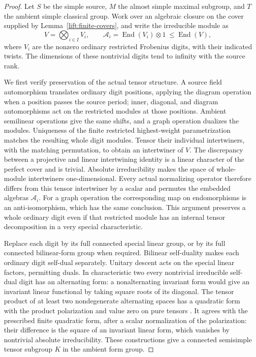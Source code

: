\begin{proof}
Let $S$ be the simple source, $M$ the almost simple maximal subgroup,
and $T$ the ambient simple classical group.  Work over an algebraic
closure on the cover supplied by Lemma~\ref{lift:finite-covers}, and
write the irreducible module as
\[
 V=\bigotimes_{i\in I}V_i,
 \qquad
 \mathcal A_i=\operatorname{End}(V_i)\otimes1
       \ \leq\operatorname{End}(V),
\]
where $V_i$ are the nonzero ordinary restricted Frobenius digits,
with their indicated twists.  The dimensions of these nontrivial
digits tend to infinity with the source rank.

We first verify preservation of the actual tensor structure.  A
source field automorphism translates ordinary digit positions,
applying the diagram operation when a position passes the source
period; inner, diagonal, and diagram automorphisms act on the
restricted modules at those positions.  Ambient semilinear
operations give the same shifts, and a graph operation dualizes
the modules.  Uniqueness of the finite restricted highest-weight
parametrization matches the resulting whole digit modules.  Tensor
their individual intertwiners, with the matching permutation, to
obtain an intertwiner of $V$.  The discrepancy between a projective
and linear intertwining identity is a linear character of the
perfect cover and is trivial.  Absolute irreducibility makes the
space of whole-module intertwiners one-dimensional.  Every actual
normalizing operator therefore differs from this tensor intertwiner
by a scalar and permutes the embedded algebras $\mathcal A_i$.
For a graph operation the corresponding map on endomorphisms is an
anti-isomorphism, which has the same conclusion.  This argument
preserves a whole ordinary digit even if that restricted module
has an internal tensor decomposition in a very special
characteristic.

Replace each digit by its full connected special linear group, or
by its full connected bilinear-form group when required.  Bilinear
self-duality makes each ordinary digit self-dual separately.
Unitary descent acts on the special linear factors, permitting
duals.  In characteristic two every nontrivial irreducible self-dual
digit has an alternating form: a nonalternating invariant form
would give an invariant linear functional by taking square roots
of its diagonal.  The tensor product of at least two nondegenerate
alternating spaces has a quadratic form with the product
polarization and value zero on pure tensors
\cite[Proposition~2.2(iv)]{LiebeckSeitzClassical1998}.
It agrees with the prescribed finite quadratic form, after a scalar
normalization of the polarization: their difference is the square
of an invariant linear form, which vanishes by nontrivial absolute
irreducibility.  These constructions give a connected semisimple
tensor subgroup $K$ in the ambient form group.


\end{proof}
